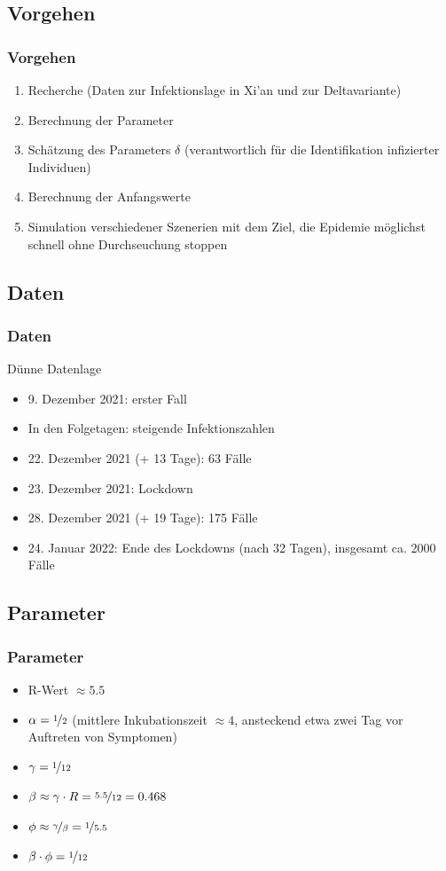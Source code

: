 \documentclass{beamer}
\begin{document}
\subsection{Vorgehen}
\begin{frame}
	\frametitle{Vorgehen}
	\begin{enumerate}
		\item Recherche (Daten zur Infektionslage in Xi'an und zur Deltavariante)
		\item Berechnung der Parameter
		\item Schätzung des Parameters $\delta$ (verantwortlich für die Identifikation infizierter Individuen)
		\item Berechnung der Anfangswerte
		\item Simulation verschiedener Szenerien mit dem Ziel, die Epidemie möglichst schnell ohne Durchseuchung stoppen
	\end{enumerate}
\end{frame}

\subsection{Daten}
\begin{frame}
	\frametitle{Daten}
	Dünne Datenlage
	\begin{itemize}
		\item 9. Dezember 2021: erster Fall
		\item In den Folgetagen: steigende Infektionszahlen
		\item 22. Dezember 2021 (+ 13 Tage): 63 Fälle
		\item 23. Dezember 2021: Lockdown
		\item 28. Dezember 2021 (+ 19 Tage): 175 Fälle
		\item 24. Januar 2022: Ende des Lockdowns (nach 32 Tagen), insgesamt ca. 2000 Fälle
	\end{itemize}
\end{frame}

\subsection{Parameter}
\begin{frame}
	\frametitle{Parameter}
	\begin{itemize}
		\item R-Wert $\approx 5.5$
		\item $\alpha = \nicefrac{1}{2}$ (mittlere Inkubationszeit $\approx 4$, ansteckend etwa zwei Tag vor Auftreten von Symptomen)
		\item $\gamma = \nicefrac{1}{12}$
		\item $\beta \approx \gamma \cdot R = \nicefrac{5.5}{12} = 0.468$
		\item $\phi \approx \nicefrac{\gamma}{\beta} = \nicefrac{1}{5.5} $
		\item $\beta \cdot \phi = \nicefrac{1}{12}$
	\end{itemize}
\end{frame}
\end{document}
